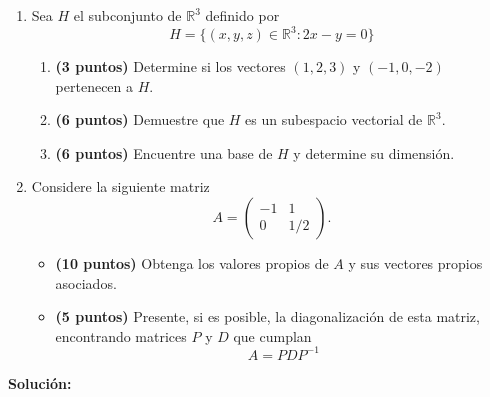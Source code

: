 \documentclass[a4paper]{article}
\begin{document}
\begin{enumerate}
\newpage
    
    \item Sea $H$ el subconjunto de $\mathbb{R}^3$ definido por
\[H=\{(x,y,z)\in\mathbb{R}^3\colon 2x-y=0  \}\]

\begin{enumerate}
\item {\bf (3 puntos)} Determine si los vectores $( 1 ,2 , 3 ) $ y $ ( -1 ,0 , -2 ) $ pertenecen a $H$.
   \item {\bf (6 puntos)} Demuestre que $H$ es un subespacio vectorial de $\mathbb{R}^3$.
    \item {\bf (6 puntos)} Encuentre una base de $H$ y determine su dimensión.

\end{enumerate}
\newpage
\phantom{0}
\newpage
    \item Considere la siguiente matriz
\[    A=\begin{pmatrix} -1 &1  \\ 0 & 1/2 \end{pmatrix}.\]
\begin{itemize}
\item[(a)] {\bf (10 puntos)} Obtenga los valores propios de \(A\) y sus vectores propios asociados.
\item[(b)] {\bf (5 puntos)} Presente, si es posible, la diagonalización de esta matriz, encontrando matrices \(P\) y \(D\) que cumplan
\[
A = P D P^{-1}
\]
\end{itemize}
\end{enumerate}
\textbf{Solución:}
\end{document}
